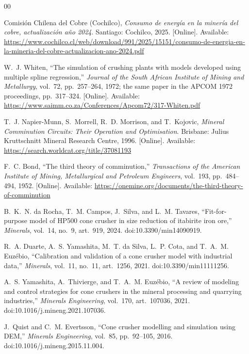 \begin{thebibliography}{00}

 Comisi\'on Chilena del Cobre (Cochilco), \emph{Consumo de energ\'ia en la miner\'ia del cobre,
actualizaci\'on a\~no 2024}. Santiago: Cochilco, 2025. [Online]. Available:
\url{https://www.cochilco.cl/web/download/991/2025/15151/consumo-de-energia-en-la-mineria-del-cobre-actualizacion-ano-2024.pdf}

 W.~J. Whiten, ``The simulation of crushing plants with models developed using multiple spline
regression,'' \emph{Journal of the South African Institute of Mining and Metallurgy}, vol.~72, pp.~257--264, 1972; the
same paper in the APCOM 1972 proceedings, pp.~317--324. [Online]. Available: \url{https://www.saimm.co.za/Conferences/Apcom72/317-Whiten.pdf}

 T.~J. Napier-Munn, S.~Morrell, R.~D. Morrison, and T.~Kojovic, \emph{Mineral Comminution
Circuits: Their Operation and Optimisation}. Brisbane: Julius Kruttschnitt Mineral Research Centre, 1996. [Online].
Available: \url{https://search.worldcat.org/title/37081193}

 F.~C. Bond, ``The third theory of comminution,'' \emph{Transactions of the American Institute of
Mining, Metallurgical and Petroleum Engineers}, vol.~193, pp.~484--494, 1952. [Online]. Available:
\url{https://onemine.org/documents/the-third-theory-of-comminution}

 B.~K.~N. da Rocha, T.~M. Campos, J.~Silva, and L.~M. Tavares, ``Fit-for-purpose model of HP500 cone
crusher in size reduction of itabirite iron ore,'' \emph{Minerals}, vol.~14, no.~9, art.~919, 2024.
doi:10.3390/min14090919.

 R.~A. Duarte, A.~S. Yamashita, M.~T. da Silva, L.~P. Cota, and T.~A.~M. Euz\'ebio, ``Calibration and
validation of a cone crusher model with industrial data,'' \emph{Minerals}, vol.~11, no.~11, art.~1256, 2021.
doi:10.3390/min11111256.

 A.~S. Yamashita, A.~Thivierge, and T.~A.~M. Euz\'ebio, ``A review of modeling and control strategies
for cone crushers in the mineral processing and quarrying industries,'' \emph{Minerals Engineering}, vol.~170,
art.~107036, 2021. doi:10.1016/j.mineng.2021.107036.

 J.~Quist and C.~M. Evertsson, ``Cone crusher modelling and simulation using DEM,'' \emph{Minerals
Engineering}, vol.~85, pp.~92--105, 2016. doi:10.1016/j.mineng.2015.11.004.


\end{thebibliography}
